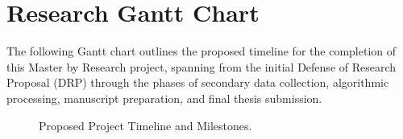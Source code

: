 \chapter*{Research Gantt Chart}

The following Gantt chart outlines the proposed timeline for the completion of this Master by Research project, spanning from the initial Defense of Research Proposal (DRP) through the phases of secondary data collection, algorithmic processing, manuscript preparation, and final thesis submission.

\begin{figure}[H]
    \centering
    \caption{Proposed Project Timeline and Milestones.}
    \label{fig:gantt}
\end{figure}
